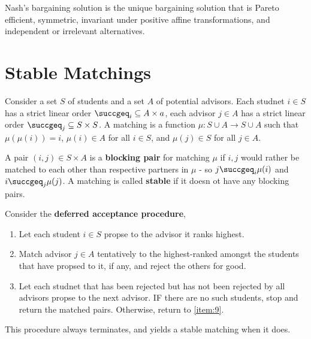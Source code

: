 \begin{thm}
  \label{sec:bargaining-4}
  Nash's bargaining solution is the unique bargaining solution that is
  Pareto efficient, symmetric, invariant under positive affine
  transformations, and independent or irrelevant alternatives.
\end{thm}

\section{Stable Matchings}
\label{sec:stable-matchings}

\begin{defn}
  \label{sec:stable-matchings-1}
  Consider a set $S$ of students and a set $A$ of potential advisors.
  Each studnet $i \in S$ has a strict linear order $\succgeq_{i}
  \subseteq A \times a$, each advisor $j \in A$ has a strict linear
  order $\succgeq_{j} \subseteq S \times S$.  A matching is a function
  $\mu: S \cup A \rightarrow S \cup A$ such that $\mu(\mu(i)) = i$,
  $\mu(i) \in A$ for all $i \in S$, and $\mu(j) \in S$ for all $j \in
  A$.  

  A pair $(i, j) \in S \times A$  is a \textbf{blocking pair} for
  matching $\mu$ if $i, j$ would rather be matched to each other than
  respective partners in $\mu$ - so $j \succgeq_{i} \mu(i)$ and $i
  \succgeq_{j} \mu(j)$.  A matching is called \textbf{stable} if it
  doesn ot have any blocking pairs.
\end{defn}

\begin{thm}
  \label{sec:stable-matchings-2}
  Consider the \textbf{deferred acceptance procedure},
  \begin{enumerate}
  \item Let each student $i \in S$ propse to the advisor it ranks highest.
  \item\label{item:9} Match advisor $j \in A$ tentatively to the highest-ranked
    amongst the students that have propsed to it, if any, and reject
    the others for good.
  \item Let each studnet that has been rejected but has not been
    rejected by all advisors propse to the next advisor. IF there are
    no such students, stop and return the matched pairs.  Otherwise,
    return to \ref{item:9}.
  \end{enumerate}

  This procedure always terminates, and yields a stable matching when
  it does.
\end{thm}

